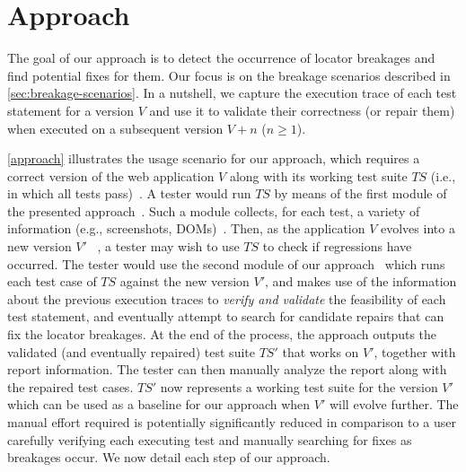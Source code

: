 \section{Approach}\label{sec:approach}

The goal of our approach is to detect the occurrence of locator breakages and find potential fixes for them. Our focus is on the  breakage scenarios described in \autoref{sec:breakage-scenarios}.
%
%
In a nutshell, we capture the execution trace of each test statement for a version $V$ and use it to validate their correctness (or repair them) when executed on a subsequent version $V+n$ ($n \geq 1$). 

\autoref{approach} illustrates the usage scenario for our approach, which requires a correct version of the web application $V$ along with its working test suite $TS$ (i.e., in which all tests pass)~. 
A tester would run $TS$ by means of the first module of the presented approach~. Such a module collects, for each test, a variety of information (e.g., screenshots, DOMs)~. 
Then, as the application $V$ evolves into a new version $V'$ ~, a tester may wish to use $TS$ to check if regressions have occurred. The tester would use the second module of our approach~ which runs each test case of $TS$ against the new version $V'$, and makes use of the information about the previous execution traces to \textit{verify and validate} the feasibility of each test statement, and eventually attempt to search for candidate repairs that can fix the locator breakages. At the end of the process, the approach outputs the validated (and eventually repaired) test suite $TS'$ that works on $V'$, together with report information. 
The tester can then manually analyze the report along with the repaired test cases. $TS'$ now represents a working test suite for the version $V'$ which can be used as a baseline for our approach when $V'$ will evolve further. 
The manual effort required is potentially significantly reduced in comparison to a user carefully verifying each executing test and manually searching for fixes as breakages occur. %
We now detail each step of our approach. 

